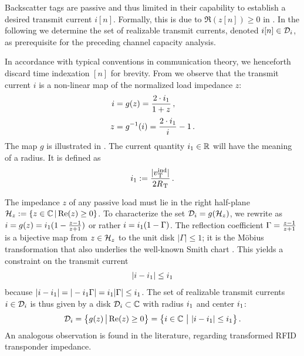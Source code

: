 Backscatter tags are passive and thus limited in their capability to establish a desired transmit current $i[n]$.
Formally, this is due to $\Re(z[n]) \geq 0$ in .
In the following we determine the set of realizable transmit currents, denoted $i[n] \in \mathcal{D}_i$, as prerequisite for the preceding channel capacity analysis.

In accordance with typical conventions in communication theory, we henceforth discard time indexation $[n]$ for brevity.
From  we observe that the transmit current $i$ is a non-linear map of the normalized load impedance $z$:
\begin{align}
i &= g(z) = \frac{2\cdot i_1}{1 + z}
\, , \label{eq:ChannelMap} \\[1mm]
z &= g^{-1}(i) = \frac{2\cdot i_1}{i} - 1
\, . \label{eq:InverseChannelMap} 
\end{align}
The map $g$ is illustrated in .
The current quantity $i_1 \in \mathbb{R}$ will have the meaning of a radius. It is defined as
\begin{align}
i_1 := \frac{|v^\mathrm{ind}_{\hspace{.2mm}\mathrm{T}}|}{2 R_{\hspace{.2mm}\mathrm{T}}}
\, . \label{eq:DiskRadius}
\end{align}

The impedance $z$ of any passive load must lie in the right half-plane
$\mathcal{H}_z := \{ z \in \mathbb{C} \, | \, \mathrm{Re}(z) \geq 0 \}$. To characterize the set $\mathcal{D}_i = g(\mathcal{H}_z)$, we rewrite  as
$i = g(z) = i_1 (1 - \frac{z-1}{z+1})$ or rather $i = i_1 (1 - \Gamma)$. The reflection coefficient $\Gamma = \frac{z-1}{z+1}$ is a bijective map from $z \in \mathcal{H}_z$ to the unit disk $|\Gamma| \leq 1$; it is the M\"obius transformation that also underlies the well-known Smith chart \cite[Eq.~(2.53)]{Pozar2004}. This yields a constraint on the transmit current
\begin{align}
|i - i_1| \leq i_1
\label{eq:Constraint}
\end{align}
because $|i- i_1| = |-i_1\Gamma| = i_1 |\Gamma| \leq i_1$.
%
The set of realizable transmit currents $i \in \mathcal{D}_i$ is thus given by a disk $\mathcal{D}_i \subset \mathbb{C}$ with radius $i_1$ and center $i_1$:
\begin{align}
\mathcal{D}_i
= \left\{ g(z) \, \big| \, \mathrm{Re}(z) \geq 0 \right\}
= \left\{ i \in \mathbb{C} \ \big| \ |i - i_1| \leq i_1 \right\} .
\label{eq:Disk}
\end{align}
An analogous observation is found in the  literature, regarding transformed RFID transponder impedance. \cite[Sec.~4.1]{Finkenzeller2015}


